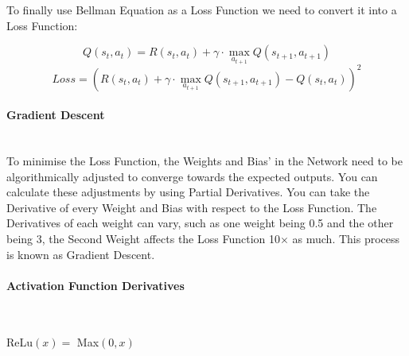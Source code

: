 \begin{flushleft}
                    To finally use Bellman Equation as a Loss Function we need to convert it into a Loss Function: \\
                    \vspace{0.2cm}

                    \[Q(s_t, a_t) = R(s_t, a_t) + \gamma \cdot \max_{a_{t+1}} Q(s_{t+1}, a_{t+1})\]
                    \[Loss = \left( R(s_t, a_t) + \gamma \cdot \max_{a_{t+1}} Q(s_{t+1}, a_{t+1}) - Q(s_t, a_t) \right)^2\]

                \paragraph{Gradient Descent} \mbox{} \\ 
                    \vspace{0.2cm}   
                    To minimise the Loss Function, the Weights and Bias' in the Network need to be algorithmically adjusted to converge towards the expected outputs. You can
                    calculate these adjustments by using Partial Derivatives. You can take the Derivative of every Weight and Bias with respect to the Loss Function. The Derivatives
                    of each weight can vary, such as one weight being 0.5 and the other being 3, the Second Weight affects the Loss Function 10$\times$ as much. This process is
                    known as Gradient Descent. \\

                \paragraph{Activation Function Derivatives} \mbox{} \\ 
                    \vspace{0.2cm}

                    \begin{center}
                        ReLu$(x) = $ Max$(0, x)$ \\
                        \vspace{0.2cm}


\end{center}
\end{flushleft}

